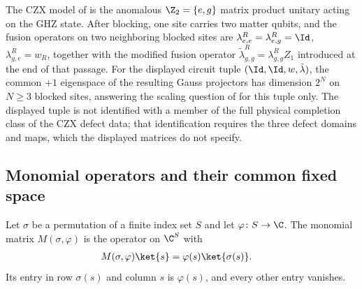 The CZX model of \cite[lines~4503--5183]{FrancoRubio2025MPUGauging} is the
anomalous $\Z_2=\{e,g\}$ matrix product unitary acting on the GHZ state.
After blocking, one site carries two matter qubits, and the fusion operators on
two neighboring blocked sites are $\lambda^R_{e,e}=\lambda^R_{e,g}=\Id$,
$\lambda^R_{g,e}=w_R$, together with the modified fusion operator
$\tilde\lambda^R_{g,g}=\lambda^R_{g,g}Z_1$ introduced at the end of that
passage.
For the displayed circuit tuple $(\Id,\Id,w,\tilde\lambda)$, the common $+1$
eigenspace of the resulting Gauss projectors has dimension $2^N$ on
$N\geq3$ blocked sites, answering the scaling question of
\cite[lines~5198--5204]{FrancoRubio2025MPUGauging} for this tuple only. The
displayed tuple is not identified with a member of the full physical
completion class of the CZX defect data; that identification requires the
three defect domains and maps, which the displayed matrices do not specify.

\subsection{Monomial operators and their common fixed space}

\begin{definition}
    \label{def:mpug_monomial_matrix}
    \leanok
    Let $\sigma$ be a permutation of a finite index set $S$ and let
    $\varphi\colon S\to\C$. The monomial matrix $M(\sigma,\varphi)$ is the
    operator on $\C^S$ with
    \begin{align}
        M(\sigma,\varphi)\ket{s} & =\varphi(s)\ket{\sigma(s)}.
        \label{eq:mpug_monomial_matrix}
    \end{align}
    Its entry in row $\sigma(s)$ and column $s$ is $\varphi(s)$, and every
    other entry vanishes.
\end{definition}

